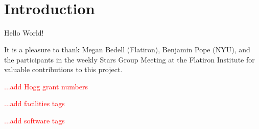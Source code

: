 \documentclass[modern]{aastex62}
\newcommand{\todo}[1]{\textcolor{red}{#1}}  %
\begin{document}
\section*{~}
\clearpage
\section{Introduction}

Hello World!

\acknowledgements
It is a pleasure to thank
  Megan Bedell (Flatiron),
  Benjamin Pope (NYU),
and the participants in the weekly Stars Group Meeting at the Flatiron
Institute for valuable contributions to this project.

\todo{...add Hogg grant numbers}

\todo{...add facilities tags}

\todo{...add software tags}


\end{document}
